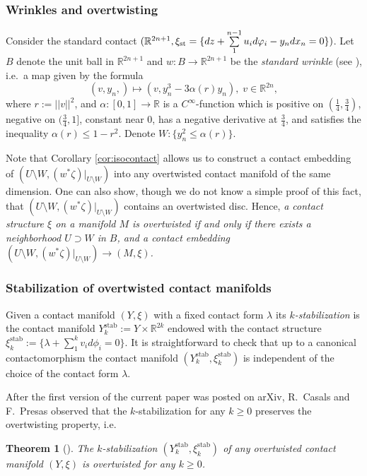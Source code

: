 \documentclass[12pt]{paper}
\theoremstyle{plain}
\newtheorem{theorem}{Theorem}[section]
\theoremstyle{definition}
\newcommand{\R}{{\mathbb{R}}}
\newcommand{\st}{{\rm st}}
\newcommand{\stab}{\mathrm{stab}}
\numberwithin{figure}{section}
\begin{document}
\subsubsection*{Wrinkles and overtwisting}

Consider  the standard contact   $(\R^{2n+1},\xi_\st=\{dz+\sum\limits_1^{n-1} u_id\varphi_i -y_ndx_n=0\})$.
Let $B$ denote the unit ball in $\R^{2n+1}$ and 
  $w:B\to\R^{2n+1}$  be the {\it standard wrinkle} (see \cite{EliMi97}), i.e.\ a map given by the formula
$$(v, y_n,)\mapsto(v, y_n^3-3\alpha(r)y_n),\; v\in\R^{2n},$$
where $r:=||v||^2$, and
 $\alpha:[0,1]\to\R$  is a $C^{\infty}$-function which is positive on $(\frac14,\frac34)$, negative on $(\frac34, 1]$, constant   near $0$,  has a negative derivative at $\frac34$, and satisfies the inequality
$\alpha(r)\leq 1-r^2$. Denote $W:\{y_n^2\leq\alpha(r)\}$.

Note that Corollary \ref{cor:isocontact} allows us to construct a contact  embedding of  $(U\setminus W,(w^*\zeta)|_{U\setminus W})$  into  any overtwisted contact manifold of the same dimension. 
One can  also show, though we do not know a simple proof of this fact, that $(U\setminus W,(w^*\zeta)|_{U\setminus W})$ contains an overtwisted disc. Hence, {\em a contact structure $\xi$ on a manifold $M$   is overtwisted if and only  
if there exists a neighborhood $U\supset W$ in $B$, and  a contact embedding $(U\setminus W,(w^*\zeta)|_{U\setminus W})\to (M,\xi)$. }
 

    
 

 
  \subsubsection*{Stabilization of overtwisted contact manifolds}
Given a contact manifold $(Y,\xi)$ with a fixed contact form $\lambda$ its {\em $k$-stabilization}
is the contact manifold $Y_k^\stab:=Y\times\R^{2k}$ endowed with the contact structure $
\xi_k^\stab:=\{\lambda+\sum\limits_1^k v_id\phi_i=0\}$. It is straightforward to check  that up to a canonical contactomorphism the contact
manifold $(Y_k^\stab,\xi_k^\stab)$ is independent of the choice of the contact form $\lambda$. 

After the first version of the current paper was posted on arXiv, 
R.~Casals and F.~Presas observed that the  $k$-stabilization for any $k\geq 0$ preserves the overtwisting property, i.e.
\begin{theorem}[\cite{CMP}]
\label{thm:stab}
The $k$-stabilization  $(Y_k^\stab,\xi_k^\stab)$
of  any overtwisted contact manifold  $(Y,\xi)$  is overtwisted for any $k\geq 0$.
\end{theorem}
\end{document}
